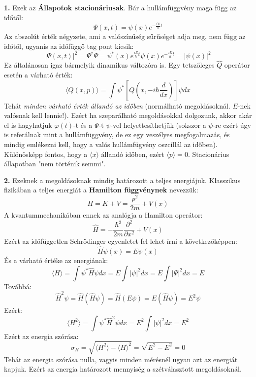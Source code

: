 \documentclass[../main.tex]{subfiles}
\begin{document}
\textbf{1.} Ezek az \textbf{Állapotok stacionáriusak}. Bár a hullámfüggvény maga függ az időtől:
\begin{equation}
    \Psi(x,t) = \psi(x) e^{-\frac{i E}{\hbar} t}
\end{equation}
Az abszolút érték négyzete, ami a valószínűség sűrűséget adja meg, nem függ az időtől, ugyanis az időfüggő tag pont kiesik:
\begin{equation}
    |\Psi(x,t)|^2 = \Psi^* \Psi = \psi^*(x) e^{\frac{i E}{\hbar} t} \psi(x) e^{-\frac{i E}{\hbar} t} = |\psi(x)|^2
\end{equation}
Ez általánosan igaz bármelyik dinamikus változóra is. Egy tetszőleges $\hat{Q}$ operátor esetén a várható érték:
\begin{equation}
    \langle Q(x, p) \rangle = \int \psi^* \left[Q(x, -i\hbar \frac{d}{dx})\right] \psi dx
\end{equation}
Tehát \textit{minden várható érték állandó az időben} (normálható megoldásoknál. $E$-nek valósnak kell lennie!). Ezért ha szeparálható megoldásokkal dolgozunk, akkor akár el is hagyhatjuk $\varphi(t)$-t és a $\Psi$-t $\psi$-vel helyettesíthetjük (sokszor a 
$\psi$-re ezért úgy is referálnak mint a hullámfüggvény, de ez egy veszélyes megfogalmazás, és mindig emlékezni kell, hogy a valós hullámfügvény oszcillál az időben). Különösképp fontos,
hogy a $\langle x \rangle$ állandó időben, ezért $\langle p \rangle = 0$. Stacionárius állapotban "nem történik semmi".

\textbf{2.} Ezeknek a megoldásoknak mindig határozott a teljes energiájuk. Klasszikus fizikában a teljes energiát a \textbf{Hamilton függvénynek} nevezzük:
\begin{equation}
    H = K + V = \frac{p^2}{2m} + V(x)
\end{equation}
A kvantummechanikában ennek az analógja a Hamilton operátor:
\begin{equation}
    \hat{H} = -\frac{\hbar^2}{2m} \frac{\partial^2}{\partial x^2} + V(x)
\end{equation}
Ezért az időfüggetlen Schrödinger egyenletet fel lehet írni a következőképpen:
\begin{equation}
    \hat{H} \psi(x) = E \psi(x)
\end{equation}
És a várható értéke az energiának:
\begin{equation}
    \langle H \rangle = \int \psi^* \hat{H} \psi dx = E \int |\psi|^2 dx = E \int | \Psi |^2 dx = E
\end{equation}
Továbbá:
\begin{equation}
    \hat{H}^2 \psi = \hat{H} (\hat{H} \psi) = \hat{H} (E \psi) = E (\hat{H} \psi) = E^2 \psi
\end{equation}
Ezért:
\begin{equation}
    \langle H^2 \rangle = \int \psi^* \hat{H}^2 \psi dx = E^2 \int |\psi|^2 dx = E^2
\end{equation}
Ezért az energia szórása:
\begin{equation}
    \sigma_H = \sqrt{\langle H^2 \rangle - \langle H \rangle^2} = \sqrt{E^2 - E^2} = 0
\end{equation}
Tehát az energia szórása nulla, vagyis minden mérésnél ugyan azt az energiát kapjuk. Ezért az energia határozott mennyiség a szétválasztott megoldásoknál.
\end{document}
